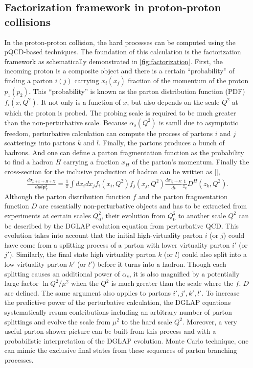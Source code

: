 \subsection{Factorization framework in proton-proton collisions}
In the proton-proton collision, the hard processes can be computed using the pQCD-based techniques.
The foundation of this calculation is the factorization framework as schematically demonstrated in \ref{fig:factorization}.
First, the incoming proton is a composite object and there is a certain ``probability'' of finding a parton $i(j)$ carrying $x_i(x_j)$ fraction of the momentum of the proton $p_1(p_2)$.
This ``probability'' is known as the parton distribution function (PDF) $f_i(x, Q^2)$.
It not only is a function of $x$, but also depends on the scale $Q^2$ at which the proton is probed.
The probing scale is required to be much greater than the non-perturbative scale.
Because $\alpha_s(Q^2)$ is samll due to asymptotic freedom, perturbative calculation can compute the process of partons $i$ and $j$ scatterings into partons $k$ and $l$.
Finally, the partons produces a bunch of hadrons. 
And one can define a parton fragmentation function as the probability to find a hadron $H$ carrying a fraction $x_H$ of the parton's momentum.
Finally the cross-section for the inclusive production of hadron can be written as [],
\begin{eqnarray}
\frac{d\sigma_{p+p\rightarrow H+X}}{dy d\mathbf{p}_T^2} = \frac{1}{\pi}\int dx_i dx_j f_i(x_i, Q^2) f_j(x_j, Q^2) \frac{d\sigma_{ij\rightarrow kl}}{d\hat{t}} \frac{1}{z_k}D^H(z_k, Q^2).
\end{eqnarray}
Although the parton distribution function $f$ and the parton fragmentation function $D$ are essentially non-perturbative objects and has to be extracted from experiments at certain scales $Q_0^2$, their evolution from $Q_0^2$ to another scale $Q^2$ can be described by the DGLAP evolution equation from perturbative QCD.
This evolution takes into account that the initial high-virtuality parton $i$ (or $j$) could have come from a splitting process of a parton with lower virtuality parton $i'$ (or $j'$).
Similarly, the final state high virtuality parton $k$ (or $l$) could also split into a low virtuality parton $k'$ (or $l'$) before it turns into a hadron.
Though each splitting causes an additional power of $\alpha_s$, it is also magnified by a potentially large factor $\ln Q^2/\mu^2$ when the $Q^2$ is much greater than the scale where the $f$, $D$ are defined.
The same argument also applies to partons $i', j', k', l'$. 
To increase the predictive power of the perturbative calculation, 
the DGLAP equations systematically resum contributions including an arbitrary number of parton splittings and evolve the scale from $\mu^2$ to the hard scale $Q^2$.
Moreover, a very useful parton-shower picture can be built from this process and with a probabilistic interpretation of the DGLAP evolution. Monte Carlo technique, one can mimic the exclusive final states from these sequences of parton branching processes.

